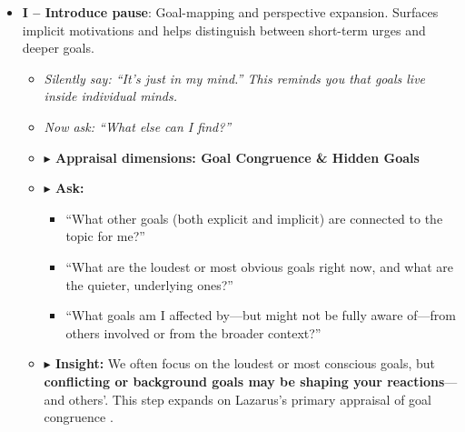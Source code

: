 \documentclass{article}
\begin{document}
\begin{itemize}[noitemsep,topsep=0pt]
    \item \textbf{I – Introduce pause}: Goal-mapping and perspective expansion. Surfaces implicit motivations and helps distinguish between short-term urges and deeper goals.
    \begin{itemize}[noitemsep,topsep=0pt]
        \item \textit{Silently say: “It’s just in my mind.” This reminds you that goals live inside individual minds.}
        \item \textit{Now ask: “What else can I find?”}
        \item \textbf{$\blacktriangleright$ Appraisal dimensions: Goal Congruence \& Hidden Goals}
        \item \textbf{$\blacktriangleright$ Ask:}
        \begin{itemize}[noitemsep,topsep=0pt]
            \item “What other goals (both explicit and implicit) are connected to the topic for me?”
            \item “What are the loudest or most obvious goals right now, and what are the quieter, underlying ones?”
            \item “What goals am I affected by—but might not be fully aware of—from others involved or from the broader context?”
        \end{itemize}
        \item \textbf{$\blacktriangleright$ Insight:} We often focus on the loudest or most conscious goals, but \textbf{conflicting or background goals may be shaping your reactions}—and others’. This step expands on Lazarus's primary appraisal of goal congruence \cite{lazarus1984stress}.
    \end{itemize}


\end{itemize}
\end{document}
